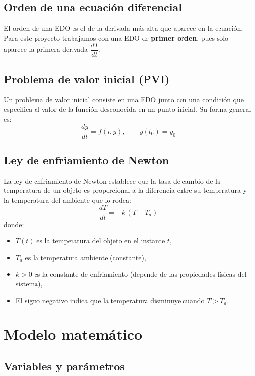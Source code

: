 \documentclass[12pt,a4paper]{article}
\begin{document}
\subsection{Orden de una ecuación diferencial}

El orden de una EDO es el de la derivada más alta que aparece en la ecuación. Para este proyecto trabajamos con una EDO de \textbf{primer orden}, pues solo aparece la primera derivada \(\dfrac{dT}{dt}\).

\subsection{Problema de valor inicial (PVI)}

Un problema de valor inicial consiste en una EDO junto con una condición que especifica el valor de la función desconocida en un punto inicial. Su forma general es:
\[
\frac{dy}{dt}=f(t,y),\qquad y(t_0)=y_0
\]

\subsection{Ley de enfriamiento de Newton}

La ley de enfriamiento de Newton establece que la tasa de cambio de la temperatura de un objeto es proporcional a la diferencia entre su temperatura y la temperatura del ambiente que lo rodea:
\[
\frac{dT}{dt} = -k\,(T - T_a)
\]
donde:
\begin{itemize}
  \item \(T(t)\) es la temperatura del objeto en el instante \(t\),
  \item \(T_a\) es la temperatura ambiente (constante),
  \item \(k > 0\) es la constante de enfriamiento (depende de las propiedades físicas del sistema),
  \item El signo negativo indica que la temperatura disminuye cuando \(T > T_a\).
\end{itemize}

\section{Modelo matemático}

\subsection{Variables y parámetros}
\end{document}
